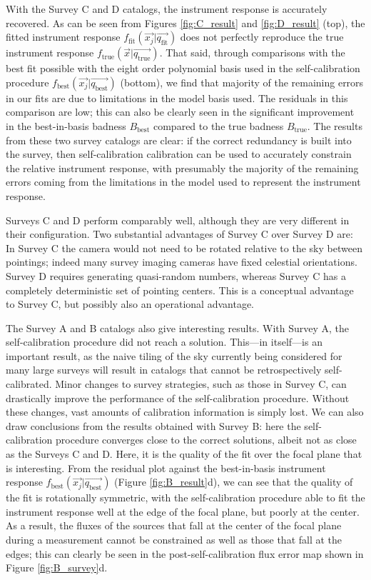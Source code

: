 \documentclass[preprint,pdftex]{aastex}
\newcommand{\true}{\text{true}}
\newcommand{\fit}{\text{fit}}
\newcommand{\basis}{\text{best}}
\begin{document}
With the Survey C and D catalogs, the instrument response is accurately recovered. As can be seen from Figures \ref{fig:C_result} and \ref{fig:D_result} (top), the fitted instrument response $f_\fit(\vec{x_j} | \vec{q_\fit})$ does not perfectly reproduce the true instrument response $f_\true(\vec{x} | \vec{q_\true})$. That said, through comparisons with the best fit possible with the eight order polynomial basis used in the self-calibration procedure $f_\basis(\vec{x_j} | \vec{q_\basis})$ (bottom), we find that majority of the remaining errors in our fits are due to limitations in the model basis used. The residuals in this comparison are low; this can also be clearly seen in the significant improvement in the best-in-basis badness $B_\basis$ compared to the true badness $B_\true$. The results from these two survey catalogs are clear: if the correct redundancy is built into the survey, then self-calibration calibration can be used to accurately constrain the relative instrument response, with presumably the majority of the remaining errors coming from the limitations in the model used to represent the instrument response. 

Surveys C and D perform comparably well, although they are very different in their configuration. Two substantial advantages of Survey C over Survey D are: In Survey C the camera would not need to be rotated relative to the sky between pointings; indeed many survey imaging cameras have fixed celestial orientations. Survey D requires generating quasi-random numbers, whereas Survey C has a completely deterministic set of pointing centers. This is a conceptual advantage to Survey C, but possibly also an operational advantage. 

The Survey A and B catalogs also give interesting results. With Survey A, the self-calibration procedure did not reach a solution. This---in itself---is an important result, as the naive tiling of the sky currently being considered for many large surveys will result in catalogs that cannot be retrospectively self-calibrated. Minor changes to survey strategies, such as those in Survey C, can drastically improve the performance of the self-calibration procedure. Without these changes, vast amounts of calibration information is simply lost. We can also draw conclusions from the results obtained with Survey B: here the self-calibration procedure converges close to the correct solutions, albeit not as close as the Surveys C and D. Here, it is the quality of the fit over the focal plane that is interesting. From the residual plot against the best-in-basis instrument response $f_\basis(\vec{x_j} | \vec{q_\basis})$ (Figure \ref{fig:B_result}d), we can see that the quality of the fit is rotationally symmetric, with the self-calibration procedure able to fit the instrument response well at the edge of the focal plane, but poorly at the center. As a result, the fluxes of the sources that fall at the center of the focal plane during a measurement cannot be constrained as well as those that fall at the edges; this can clearly be seen in the post-self-calibration flux error map shown in Figure \ref{fig:B_survey}d.
\end{document}
